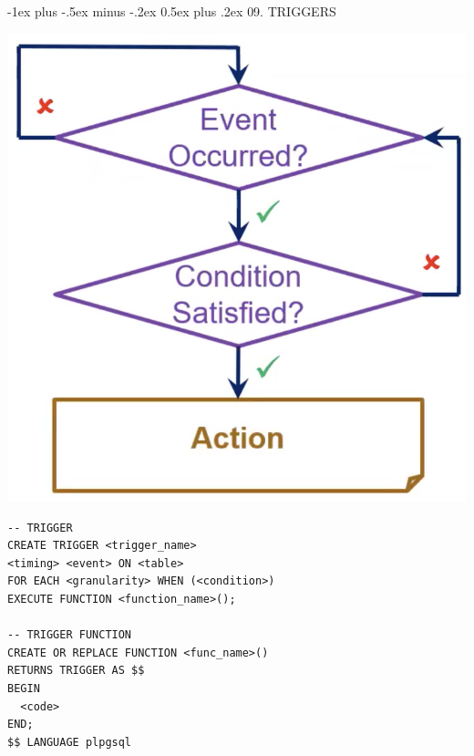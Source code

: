 \documentclass[10pt, landscape]{article}
\makeatletter
\renewcommand{\section}{\@startsection{section}{1}{0mm}%
  {-1ex plus -.5ex minus -.2ex}%
  {0.5ex plus .2ex}%
{\normalfont\large\bfseries}}
\makeatother
\begin{document}
\begin{multicols}{3}
  \section{09. TRIGGERS}
  \begin{minipage}[c]{0.33\linewidth}
    \includegraphics[width=0.9\linewidth]{cs2102-triggers-flow.png} 
  \end{minipage}
  \begin{minipage}[c]{0.65\linewidth}
    \begin{lstlisting}[style=mySQL]
-- TRIGGER
CREATE TRIGGER <trigger_name> 
<timing> <event> ON <table> 
FOR EACH <granularity> WHEN (<condition>)
EXECUTE FUNCTION <function_name>();

-- TRIGGER FUNCTION
CREATE OR REPLACE FUNCTION <func_name>()
RETURNS TRIGGER AS $$
BEGIN 
  <code>
END;
$$ LANGUAGE plpgsql
    \end{lstlisting}
  \end{minipage}


\end{multicols}
\end{document}
